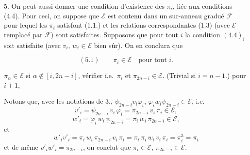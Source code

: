 
5. On peut aussi donner une condition d'existence des $\pi_{i}$, liée aux
conditions (4.4). Pour ceci, on suppose que $\mathcal{E}$ est contenu dans un
sur-anneau gradué $\mathcal{F}$  pour lequel les $\pi_{i}$ satisfont (1.1.)
et les relations correspondantes (1.3) (avec $\mathcal{E}$ remplacé par
$\mathcal{F}$)  sont
satisfaites.  Supposons que pour tout $i$ la condition
$(4.4)_{i}$ soit satisfaite (avec $v_{i}$, $w_{i} \in \mathcal{E}$ bien sûr).
On en conclura que

\[ (5.1) \qquad \pi_{i} \in \mathcal{E} \quad \text{pour tout } i . \]

  \ill{} $\pi_{\alpha} \in
\mathcal{E}$ si $\alpha \notin [i, 2n-i]$,  vérifier \ill{}
 i.e.\ $\pi_{i}$ et $\pi_{2n-i} \in \mathcal{E}$.
(Trivial si $i = n-1$.) 
 pour $i+1$,

Notons que, avec les notations de 3., \struck{\ill{}}
$\psi_{2n-i} v_{i} \varphi_{i}$, $\varphi_{i} w_{i} \psi_{2n-i} \in
\mathcal{E}$, i.e.
\[ v'_{i} = \psi_{2n-i}\, v_{i}\, \varphi_{i} = \pi_{2n-i}\, v_{i}\, \pi_{i} \in \mathcal{E} , \]
\[ w'_{i} = \varphi_{i}\, w_{i}\, \psi_{2n-i} = \pi_{i}\, w_{i}\, \pi_{2n-i} \in \mathcal{E} , \]
et 
\[ w'_{i} v'_{i} = \pi_{i}\, w_{i}\, \pi_{2n-i}\, v_{i}\, \pi_{i} = \pi_{i}\, \pi_{i}\, w_{i}\, v_{i}\, \pi_{i} = \pi_{i}^{3} = \pi_{i} \]
et de même $v'_{i} w'_{i} = \pi_{2n-i}$, on conclut que $\pi_{i} \in
\mathcal{E}$, $\pi_{2n-i} \in \mathcal{E}$.

